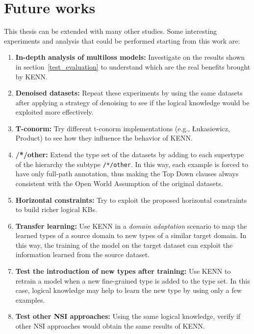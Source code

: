\section{Future works} \label{future_works}
This thesis can be extended with many other studies. Some interesting experiments and analysis that could be performed starting from this work are:
\begin{enumerate}
    \item \textbf{In-depth analysis of multiloss models:} Investigate on the results shown in section~\ref{test_evaluation} to understand which are the real benefits brought by KENN.
    \item \textbf{Denoised datasets:} Repeat these experiments by using the same datasets after applying a strategy of denoising to see if the logical knowledge would be exploited more effectively.
    \item \textbf{T-conorm:} Try different t-conorm implementations (e.g., Łukasiewicz, Product) to see how they influence the behavior of KENN.
    \item \textbf{/*/other:} Extend the type set of the datasets by adding to each supertype of the hierarchy the subtype \verb|/*/other|. In this way, each example is forced to have only full-path annotation, thus making the Top Down clauses always consistent with the Open World Assumption of the original datasets.
    \item \textbf{Horizontal constraints:} Try to exploit the proposed horizontal constraints to build richer logical KBs. 
    \item \textbf{Transfer learning:} Use KENN in a \textit{domain adaptation} scenario to map the learned types of a source domain to new types of a similar target domain. In this way, the training of the model on the target dataset can exploit the information learned from the source dataset.
    \item \textbf{Test the introduction of new types after training: } Use KENN to retrain a model when a new fine-grained type is added to the type set. In this case, logical knowledge may help to learn the new type by using only a few examples.
    \item \textbf{Test other NSI approaches: } Using the same logical knowledge, verify if other NSI approaches would obtain the same results of KENN.
\end{enumerate}
